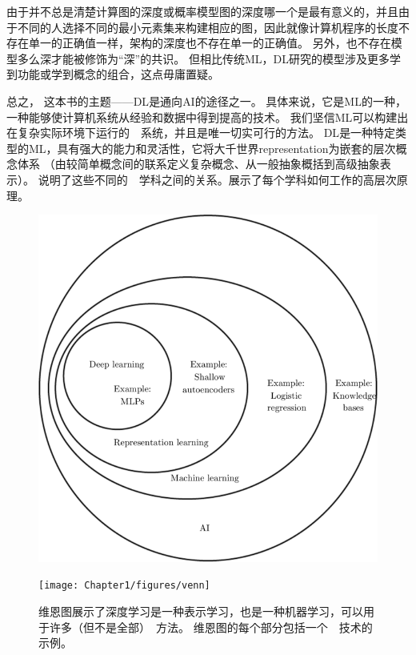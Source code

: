 
由于并不总是清楚计算图的深度或概率模型图的深度哪一个是最有意义的，并且由于不同的人选择不同的最小元素集来构建相应的图，因此就像计算机程序的长度不存在单一的正确值一样，架构的深度也不存在单一的正确值。
另外，也不存在模型多么深才能被修饰为``深''的共识。
但相比传统\gls{ML}，\gls{DL}研究的模型涉及更多学到功能或学到概念的组合，这点毋庸置疑。

总之， 这本书的主题——\gls{DL}是通向\gls{AI}的途径之一。
具体来说，它是\gls{ML}的一种，一种能够使计算机系统从经验和数据中得到提高的技术。
我们坚信\gls{ML}可以构建出在复杂实际环境下运行的~~系统，并且是唯一切实可行的方法。
\gls{DL}是一种特定类型的\gls{ML}，具有强大的能力和灵活性，它将大千世界\gls{representation}为嵌套的层次概念体系
（由较简单概念间的联系定义复杂概念、从一般抽象概括到高级抽象表示）。
说明了这些不同的~~学科之间的关系。展示了每个学科如何工作的高层次原理。

\begin{figure}[!hbt]
\ifOpenSource
\centerline{\includegraphics[scale=0.5]{images/4.png}}
\else
\centerline{\texttt{[image: Chapter1/figures/venn]}}
\fi
\caption{维恩图展示了深度学习是一种表示学习，也是一种机器学习，可以用于许多（但不是全部）~方法。
维恩图的每个部分包括一个~~技术的示例。
}
\label{fig:chap1_venn}
\end{figure}

